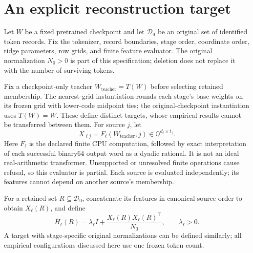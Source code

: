 \documentclass[10pt,twocolumn,letterpaper]{article}
\newcommand{\Q}{\mathbb{Q}}
\newcommand{\calD}{\mathcal{D}}
\begin{document}
\section{An explicit reconstruction target}
\label{sec:target}
Let $W$ be a fixed pretrained checkpoint and let $\calD_0$ be an original set of
identified token records. Fix the tokenizer, record boundaries, stage order,
coordinate order, ridge parameters, row grids, and finite feature evaluator.
The original normalization $N_0>0$ is part of this specification; deletion does
not replace it with the number of surviving tokens.

Fix a checkpoint-only teacher $W_{\mathrm{teacher}}=T(W)$ before selecting
retained membership. The nearest-grid instantiation rounds each stage's base
weights on its frozen grid with lower-code midpoint ties; the original-checkpoint
instantiation uses $T(W)=W$. These define distinct targets, whose empirical
results cannot be transferred between them. For source $j$, let
\[
 X_{\ell j}=F_\ell(W_{\mathrm{teacher}},j)
       \in\Q^{d_\ell\times t_j}.
\]
Here $F_\ell$ is the declared finite CPU computation, followed by exact
interpretation of each successful binary64 output word as a dyadic rational.
It is not an ideal real-arithmetic transformer. Unsupported or unresolved finite
operations cause refusal, so this evaluator is partial. Each source is evaluated
independently; its features cannot depend on another source's membership.

For a retained set $R\subseteq\calD_0$, concatenate its features in canonical
source order to obtain $X_\ell(R)$, and define
\begin{equation}
 H_\ell(R)=\lambda_\ell I+
   \frac{X_\ell(R)X_\ell(R)^\top}{N_0},
 \qquad \lambda_\ell>0.
 \label{eq:metric}
\end{equation}
A target with stage-specific original normalizations can be defined similarly;
all empirical configurations discussed here use one frozen token count.
\end{document}
